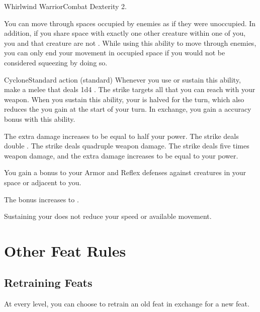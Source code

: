   \begin{feat}{Whirlwind Warrior}{Combat}
    \featpre Dexterity 2.

     You can move through spaces occupied by enemies as if they were unoccupied.
    In addition, if you share space with exactly one other creature within one  of you, you and that creature are not \squeezing.
    While using this ability to move through enemies, you can only end your movement in occupied space if you would not be considered squeezing by doing so.

    \begin{sustainability}{Cyclone}{Standard action}
      \abilitytags {} (standard)
      \rankline
      Whenever you use or sustain this ability, make a melee  that deals 1d4 .
      The strike targets all  that you can reach with your weapon.
      When you sustain this ability, your  is halved for the turn, which also reduces the  you gain at the start of your turn.
      In exchange, you gain a  accuracy bonus with this ability.

      \rankline
       The extra damage increases to be equal to half your power.
       The strike deals double .
       The strike deals quadruple weapon damage.
       The strike deals five times weapon damage, and the extra damage increases to be equal to your power.
    \end{sustainability}

     You gain a  bonus to your Armor and Reflex defenses against creatures in your space or adjacent to you.

     The bonus increases to .

     Sustaining your  does not reduce your speed or available movement.
  \end{feat}

\section{Other Feat Rules}

  \subsection{Retraining Feats}
    At every level, you can choose to retrain an old feat in exchange for a new feat.
